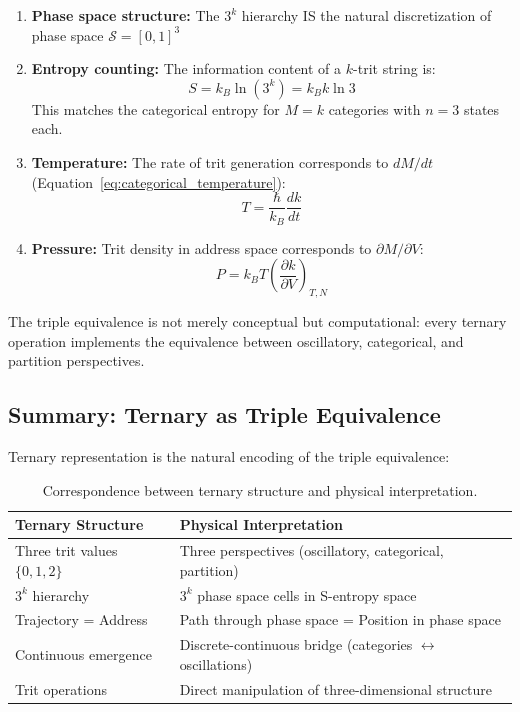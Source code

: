 \begin{enumerate}
\item \textbf{Phase space structure:} The $3^k$ hierarchy IS the natural discretization of phase space $\mathcal{S} = [0,1]^3$

\item \textbf{Entropy counting:} The information content of a $k$-trit string is:
\begin{equation}
S = k_B \ln(3^k) = k_B k \ln 3
\end{equation}
This matches the categorical entropy for $M = k$ categories with $n = 3$ states each.

\item \textbf{Temperature:} The rate of trit generation corresponds to $dM/dt$ (Equation~\ref{eq:categorical_temperature}):
\begin{equation}
T = \frac{\hbar}{k_B} \frac{dk}{dt}
\end{equation}

\item \textbf{Pressure:} Trit density in address space corresponds to $\partial M/\partial V$:
\begin{equation}
P = k_B T \left(\frac{\partial k}{\partial V}\right)_{T,N}
\end{equation}
\end{enumerate}

The triple equivalence is not merely conceptual but computational: every ternary operation implements the equivalence between oscillatory, categorical, and partition perspectives.

\subsection{Summary: Ternary as Triple Equivalence}

Ternary representation is the natural encoding of the triple equivalence:

\begin{table}[h]
\centering
\begin{tabular}{p{5cm}p{7cm}}
\hline
\textbf{Ternary Structure} & \textbf{Physical Interpretation} \\
\hline
Three trit values $\{0, 1, 2\}$ & Three perspectives (oscillatory, categorical, partition) \\[0.2cm]
$3^k$ hierarchy & $3^k$ phase space cells in S-entropy space \\[0.2cm]
Trajectory = Address & Path through phase space = Position in phase space \\[0.2cm]
Continuous emergence & Discrete-continuous bridge (categories $\leftrightarrow$ oscillations) \\[0.2cm]
Trit operations & Direct manipulation of three-dimensional structure \\
\hline
\end{tabular}
\caption{Correspondence between ternary structure and physical interpretation.}
\label{tab:ternary_summary}
\end{table}

